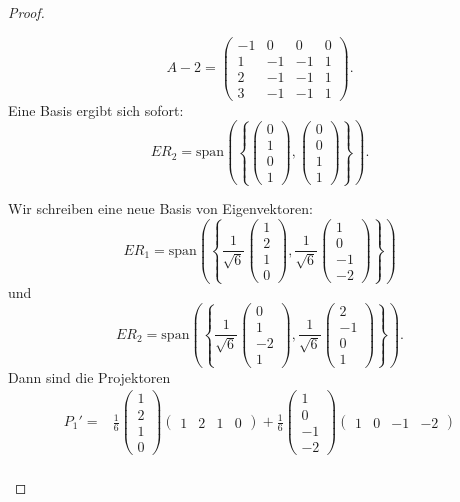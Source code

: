 \begin{proof}
\begin{parts}
		\[
			A-2=\begin{pmatrix} -1 & 0 & 0 & 0 \\ 1 & -1 & -1 & 1 \\ 2 & -1 & -1 & 1 \\ 3 & -1 & -1 & 1 \end{pmatrix} 
		.\] 
		Eine Basis ergibt sich sofort:
		\[
			ER_2=\text{span}\left(\left\{ \begin{pmatrix} 0 \\ 1 \\ 0 \\ 1 \end{pmatrix} , \begin{pmatrix} 0 \\ 0 \\ 1 \\ 1 \end{pmatrix}  \right\}\right) 
		.\] 
	\item 
		Wir schreiben eine neue Basis von Eigenvektoren:
		\[
			ER_1=\text{span}\left( \left\{\frac{1}{\sqrt{6} } \begin{pmatrix}1 \\ 2 \\ 1 \\ 0  \end{pmatrix}, \frac{1}{\sqrt{6} }\begin{pmatrix} 1 \\ 0 \\ -1 \\ -2 \end{pmatrix}   \right\}  \right) 
		\]
		und
		\[
			ER_2=\text{span}\left( \left\{ \frac{1}{\sqrt{6} }\begin{pmatrix} 0 \\ 1 \\ -2 \\ 1 \end{pmatrix} , \frac{1}{\sqrt{6} }\begin{pmatrix} 2 \\ -1 \\ 0 \\ 1 \end{pmatrix}  \right\}  \right) 
		.\] 
		Dann sind die Projektoren
		\begin{align*}
			P_1'=&\frac{1}{6}\begin{pmatrix} 1 \\ 2 \\ 1 \\ 0 \end{pmatrix} \begin{pmatrix} 1 & 2 & 1 & 0 \end{pmatrix} +\frac{1}{6}\begin{pmatrix} 1 \\ 0 \\ -1 \\ -2 \end{pmatrix} \begin{pmatrix} 1 & 0 & -1 & -2 \end{pmatrix} \\

\end{align*}
\end{parts}
\end{proof}
